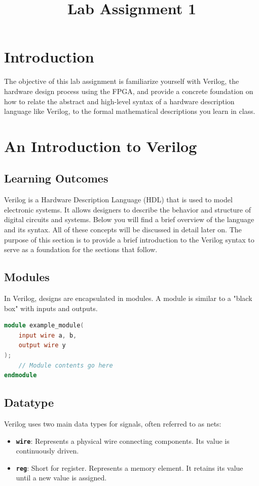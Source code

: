 \documentclass[12pt]{journal}
\title{Lab Assignment 1 }
\author{}
\date{}
\begin{document}
\captionsetup{tablewithin=section}
\maketitle
\section{Introduction}
The objective of this lab assignment is familiarize yourself with Verilog, the hardware design process using the FPGA, and provide a concrete foundation on how to relate the abstract and high-level syntax of a hardware description language like Verilog, to the formal mathematical descriptions you learn in class.

\section{An Introduction to Verilog}

\subsection{Learning Outcomes}
Verilog is a Hardware Description Language (HDL) that is used to model electronic systems. It allows designers to describe the behavior and structure of digital circuits and systems. Below you will find a brief overview of the language and its syntax. All of these concepts will be discussed in detail later on. The purpose of this section is to provide a brief introduction to the Verilog syntax to serve as a foundation for the sections that follow.

\subsection{Modules}

In Verilog, designs are encapsulated in modules. A module is similar to a "black box" with inputs and outputs.

\begin{lstlisting}[language=verilog]    
module example_module(
    input wire a, b,
    output wire y
);
    // Module contents go here
endmodule
\end{lstlisting}


\subsection{Datatype}

Verilog uses two main data types for signals, often referred to as nets:
\begin{itemize}
    \item {\textbf{\texttt{wire}}: Represents a physical wire connecting components. Its value is continuously driven.}
    \item {\textbf{\texttt{reg}}: Short for register. Represents a memory element. It retains its value until a new value is assigned.}
\end{itemize}
\end{document}
